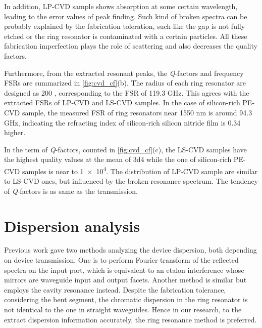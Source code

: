 In addition, LP-CVD sample shows absorption at some certain wavelength, leading to the error values of peak finding. Such kind of broken spectra can be probably explained by the fabrication toleration, such like the gap is not fully etched or the ring resonator is contaminated with a certain particles. All these fabrication imperfection plays the role of scattering and also decreases the quality factors.

Furthermore, from the extracted resonant peaks, the \textit{Q}-factors and frequency FSRs are summarized in \autoref{fig:cvd_cf}(b). The radius of each ring resonator are designed as 200 \um, corresponding to the FSR of 119.3 GHz. This agrees with the extracted FSRs of LP-CVD and LS-CVD samples. In the case of silicon-rich PE-CVD sample, the measured FSR of ring resonators near 1550 nm is around 94.3 GHz, indicating the refracting index of silicon-rich silicon nitride film is 0.34 higher.

In the term of \textit{Q}-factors, counted in \autoref{fig:cvd_cf}(c), the LS-CVD samples have the highest quality values at the mean of \num{3d4} while the one of silicon-rich PE-CVD samples is near to \num{1e4}. The distribution of LP-CVD sample are similar to LS-CVD ones, but influenced by the broken resonance spectrum. The tendency of \textit{Q}-factors is as same as the transmission.

\begin{figure}[t]
	\centering
	
	\label{fig:cvd_cf}
\end{figure}




\section{Dispersion analysis}

Previous work \cite{Sunada2018} gave two methods analyzing the device dispersion, both depending on device transmission. One is to perform Fourier transform of the reflected spectra on the input port, which is equivalent to an etalon interference whose mirrors are waveguide input and output facets. Another method is similar but employs the cavity resonance instead. Despite the fabrication tolerance, considering the bent segment, the chromatic dispersion in the ring resonator is not identical to the one in straight waveguides. Hence in our research, to the extract dispersion information accurately, the ring resonance method is preferred. 

